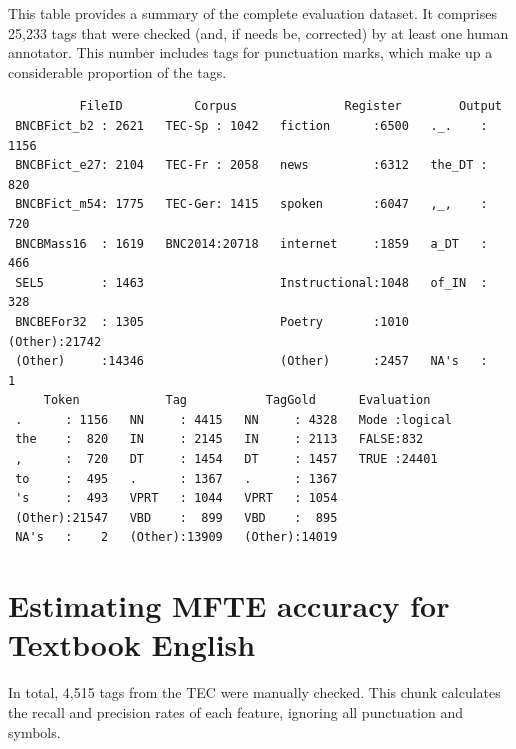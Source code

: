\documentclass[
  letterpaper,
  DIV=11,
  numbers=noendperiod]{scrreprt}
\begin{document}
This table provides a summary of the complete evaluation dataset. It
comprises 25,233 tags that were checked (and, if needs be, corrected) by
at least one human annotator. This number includes tags for punctuation
marks, which make up a considerable proportion of the tags.

\begin{verbatim}
          FileID          Corpus               Register        Output     
 BNCBFict_b2 : 2621   TEC-Sp : 1042   fiction      :6500   ._.    : 1156  
 BNCBFict_e27: 2104   TEC-Fr : 2058   news         :6312   the_DT :  820  
 BNCBFict_m54: 1775   TEC-Ger: 1415   spoken       :6047   ,_,    :  720  
 BNCBMass16  : 1619   BNC2014:20718   internet     :1859   a_DT   :  466  
 SEL5        : 1463                   Instructional:1048   of_IN  :  328  
 BNCBEFor32  : 1305                   Poetry       :1010   (Other):21742  
 (Other)     :14346                   (Other)      :2457   NA's   :    1  
     Token            Tag           TagGold      Evaluation     
 .      : 1156   NN     : 4415   NN     : 4328   Mode :logical  
 the    :  820   IN     : 2145   IN     : 2113   FALSE:832      
 ,      :  720   DT     : 1454   DT     : 1457   TRUE :24401    
 to     :  495   .      : 1367   .      : 1367                  
 's     :  493   VPRT   : 1044   VPRT   : 1054                  
 (Other):21547   VBD    :  899   VBD    :  895                  
 NA's   :    2   (Other):13909   (Other):14019                  
\end{verbatim}

\section{Estimating MFTE accuracy for Textbook
English}\label{estimating-mfte-accuracy-for-textbook-english}

In total, 4,515 tags from the TEC were manually checked. This chunk
calculates the recall and precision rates of each feature, ignoring all
punctuation and symbols.
\end{document}
